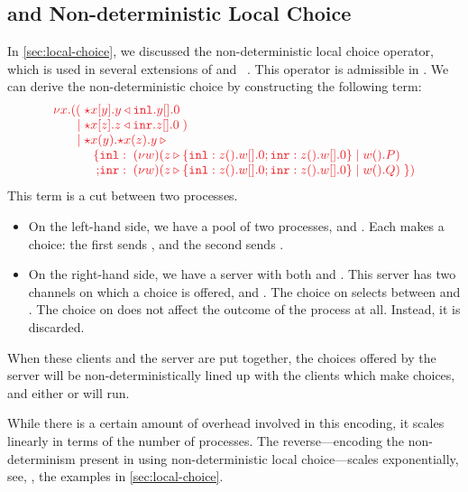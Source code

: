 \documentclass[envcountsame,UKenglish]{llncs}
\begin{document}
\subsection{\nodcap and Non-deterministic Local Choice}\label{sec:nc-local-choice}
In \cref{sec:local-choice}, we discussed the non-deterministic local choice operator, which is used in several extensions of \piDILL and \cp~\cite{atkey2016,caires2014,caires2017}. This operator is admissible in \nodcap. We can derive the non-deterministic choice  by constructing the following term:
\[%
  \arraycolsep=0pt
  \tm{
  \begin{array}{lrlrl}
    \nu x.&((  & \; \ncCnt{x}{y}{\cpInl{y}{\cpHalt{y}}} \\
          &\mid& \; \ncCnt{x}{z}{\cpInr{z}{\cpHalt{z}}} \; )\\
          &\mid& \; \ncSrv{x}{y}{\ncSrv{x}{z}{y\:{\triangleright}}}\\
          &    & \quad
                 \begin{array}{rl}
                   \{ & \texttt{inl}: \; \cpCut{w}{\cpCase{z}{\cpWait{z}{\cpHalt{w}}}{
                           \cpWait{z}{\cpHalt{w}}}}{\cpWait{w}{P}}
                   \\
                    ; & \texttt{inr}: \; \cpCut{w}{\cpCase{z}{\cpWait{z}{\cpHalt{w}}}{
                           \cpWait{z}{\cpHalt{w}}}}{\cpWait{w}{Q}} \; \})
                 \end{array}
  \end{array}
  }
\]
This term is a cut between two processes.
\begin{itemize}
\item
  On the left-hand side, we have a pool of two processes,  and . Each makes a choice: the first sends , and the second sends . 
\item
  On the right-hand side, we have a server with both  and . This server has two channels on which a choice is offered,  and . The choice on  selects between  and . The choice on  does not affect the outcome of the process at all. Instead, it is discarded.
\end{itemize}
When these clients and the server are put together, the choices offered by the server will be non-deterministically lined up with the clients which make choices, and either  or  will run.

While there is a certain amount of overhead involved in this encoding, it scales linearly in terms of the number of processes. The reverse---encoding the non-determinism present in \nodcap using non-deterministic local choice---scales exponentially, see, \eg, the examples in \cref{sec:local-choice}.
\end{document}
